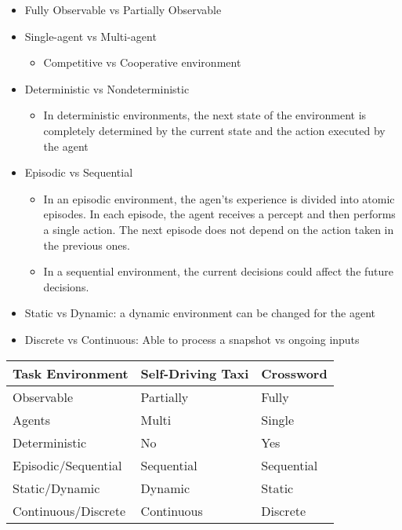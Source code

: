 \documentclass[12pt]{article}
\begin{document}
\begin{itemize}
    \item Fully Observable vs Partially Observable
    
    \item Single-agent vs Multi-agent
    \begin{itemize}
        \item Competitive vs Cooperative environment
    \end{itemize}
    
    \item Deterministic vs Nondeterministic
    
    \begin{itemize}
        \item In deterministic environments, the next state of the environment is completely determined by the current state and the action executed by the agent
    \end{itemize}
    
    \item Episodic vs Sequential
    \begin{itemize}
        \item In an episodic environment, the agen'ts experience is divided into atomic episodes. 
        In each episode, the agent receives a percept and then performs a single action. 
        The next episode does not depend on the action taken in the previous ones.
        
        \item In a sequential environment, the current decisions could affect the future decisions.
    \end{itemize}

    \item Static vs Dynamic: a dynamic environment can be changed for the agent

    \item Discrete vs Continuous: Able to process a snapshot vs ongoing inputs

\end{itemize}

\begin{tabular}{l | l l}
    Task Environment & Self-Driving Taxi & Crossword \\ \hline
    Observable & Partially & Fully \\
    Agents & Multi & Single \\
    Deterministic & No & Yes \\
    Episodic/Sequential & Sequential & Sequential \\ 
    Static/Dynamic & Dynamic & Static \\
    Continuous/Discrete & Continuous & Discrete 
\end{tabular}
\end{document}
